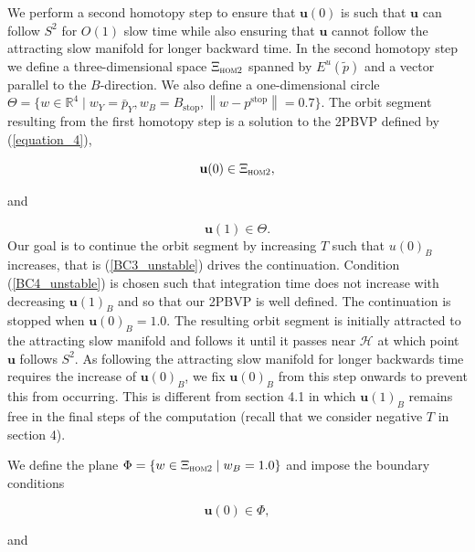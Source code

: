 \documentclass{ws-ijbc}
\begin{document}
We perform a second homotopy step to ensure that $\mathbf{u}(0)$ is such that $\mathbf{u}$ can follow $S^2$ for $O(1)$ slow time while also ensuring that $\mathbf{u}$ cannot follow the attracting slow manifold for longer backward time.  In the second homotopy step we define a three-dimensional space $\Xi_{\textsc{hom2}}$ spanned by $E^u(\tilde{p})$ and a vector parallel to the $B$-direction.  We also define a one-dimensional circle $\Theta = \{ w \in \mathbb{R}^4 \; | \; w_Y=\bar{p}_Y, w_B=B_{\mathrm{stop}}, \left\lVert w-p^{\mathrm{stop}} \right\lVert=0.7\}$.  The orbit segment resulting from the first homotopy step is a solution to the 2PBVP defined by (\ref{equation_4}),

\begin{equation}
\mathbf{u}(0) \in \Xi_{\textsc{hom2}},
\label{BC3_unstable}
\end{equation}

\noindent
and 

\begin{equation}
\mathbf{u}(1) \in \Theta.
\label{BC4_unstable}
\end{equation}
\noindent
Our goal is to continue the orbit segment by increasing $T$ such that $u(0)_B$ increases, that is (\ref{BC3_unstable}) drives the continuation.  Condition (\ref{BC4_unstable}) is chosen such that integration time does not increase with decreasing $\mathbf{u}(1)_B$ and so that our 2PBVP is well defined.  The continuation is stopped when $\mathbf{u}(0)_B =1.0$.  The resulting orbit segment is initially attracted to the attracting slow manifold and follows it until it passes near $\mathscr{H}$ at which point $\mathbf{u}$ follows $S^2$.  As following the attracting slow manifold for longer backwards time requires the increase of $\mathbf{u}(0)_B$, we fix $\mathbf{u}(0)_B$ from this step onwards to prevent this from occurring.  This is different from section 4.1 in which $\mathbf{u}(1)_B$ remains free in the final steps of the computation (recall that we consider negative $T$ in section 4).

We define the plane $\Phi = \{w \in \Xi_{\textsc{hom2}} \; | \;  w_B=1.0\}$ and impose the boundary conditions

\begin{equation}
\mathbf{u}(0) \in \Phi,
\label{BC5_unstable}
\end{equation}

\noindent
and 
\end{document}
